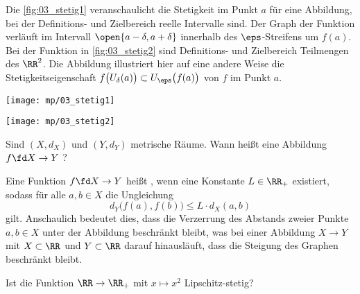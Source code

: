 \begin{antwort}[]
  \Ant Die \Abb\ref{fig:03_stetig1} veranschaulicht die Stetigkeit 
  im Punkt $a$ für eine Abbildung, 
  bei der Definitions- und Zielbereich reelle Intervalle sind. 
  Der Graph der Funktion verläuft im Intervall $\open{a-\delta,a+\delta}$ 
  innerhalb des $\eps$-Streifens um $f(a)$. Bei der 
  Funktion in \Abb\ref{fig:03_stetig2} sind Definitions- und Zielbereich 
  Teilmengen des $\RR^2$. Die Abbildung illustriert hier auf eine andere 
  Weise die Stetigkeitseigenschaft $f\big(U_\delta(a)\big)
  \subset U_\eps\big( f(a) \big)$ 
  von $f$ im Punkt $a$. \AntEnd

  \begin{center}
    \begin{minipage}{60mm}
      \texttt{[image: mp/03\_stetig1]}
      \label{fig:03_stetig1}
    \end{minipage}
    \qquad
    \begin{minipage}{60mm}
      \texttt{[image: mp/03\_stetig2]}
      \label{fig:03_stetig2}
    \end{minipage}
  \end{center}
\end{antwort}

\begin{frage}\label{03_lips}
  Sind $(X,d_X)$ und $(Y,d_Y)$ metrische Räume. Wann heißt eine Abbildung 
  $f\fd X\to Y$ ? 
\end{frage}

\begin{antwort}
  Eine Funktion $f\fd X\to Y$ heißt 
  , wenn eine Konstante 
  $L\in \RR_+$ existiert, sodass für alle $a,b\in X$ die Ungleichung 
  \begin{equation}
    d_Y \big( f(a), f(b) \big) \le L \cdot d_X (a,b) \tag{$\ast$}
  \end{equation}
  gilt. Anschaulich bedeutet dies, dass die Verzerrung des Abstands zweier 
  Punkte $a, b \in X$ unter der Abbildung beschränkt bleibt, was bei einer 
  Abbildung $X\to Y$ mit $X\subset \RR$ und $Y\subset \RR$ 
  darauf hinausläuft, dass die Steigung des Graphen beschränkt bleibt.   
\end{antwort}

\begin{frage}
  Ist die Funktion $\RR\to\RR_+$ mit $x\mapsto x^2$ Lipschitz-stetig?
\end{frage}

